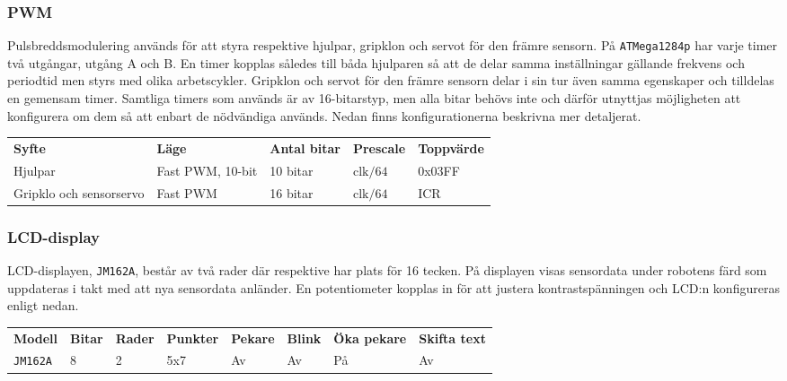 \documentclass[11pt]{article}
\begin{document}
\begin{flushleft}
\begin{description}[style=unboxed, leftmargin=0cm]
\end{description}


\subsubsection{PWM}
Pulsbreddsmodulering används för att styra respektive hjulpar, gripklon och servot för den främre sensorn. På \verb+ATMega1284p+ har varje timer två utgångar, utgång A och B. En timer kopplas således till båda hjulparen så att de delar samma inställningar gällande frekvens och periodtid men styrs med olika arbetscykler. Gripklon och servot för den främre sensorn delar i sin tur även samma egenskaper och tilldelas en gemensam timer. Samtliga timers som används är av 16-bitarstyp, men alla bitar behövs inte och därför utnyttjas möjligheten att konfigurera om dem så att enbart de nödvändiga används. Nedan finns konfigurationerna beskrivna mer detaljerat. 

\begin{center}
\begin{tabular}{l l l l l}

    \textbf{Syfte} & \textbf{Läge} & \textbf{Antal bitar} & \textbf{Prescale} & \textbf{Toppvärde} \\
    Hjulpar & Fast PWM, 10-bit & 10 bitar & $\text{clk}/64$ &  0x03FF \\
	Gripklo och sensorservo & Fast PWM & 16 bitar & $\text{clk}/64$  & ICR \\
\end{tabular}
\end{center}

\subsubsection{LCD-display}
LCD-displayen, \verb+JM162A+, består av två rader där respektive har plats för 16 tecken. På displayen visas sensordata under robotens färd som uppdateras i takt med att nya sensordata anländer. En potentiometer kopplas in för att justera kontrastspänningen och LCD:n konfigureras enligt nedan.

\begin{center}
  \begin{tabular}{l l l l l l l l}
      \textbf{Modell} & \textbf{Bitar} & \textbf{Rader} & \textbf{Punkter} & \textbf{Pekare} & \textbf{Blink} & \textbf{Öka pekare} & \textbf{Skifta text} \\
      \verb+JM162A+ & 8 & 2 & 5x7 & Av & Av & På & Av \\
    \end{tabular}
  \end{center}


\end{flushleft}
\end{document}

